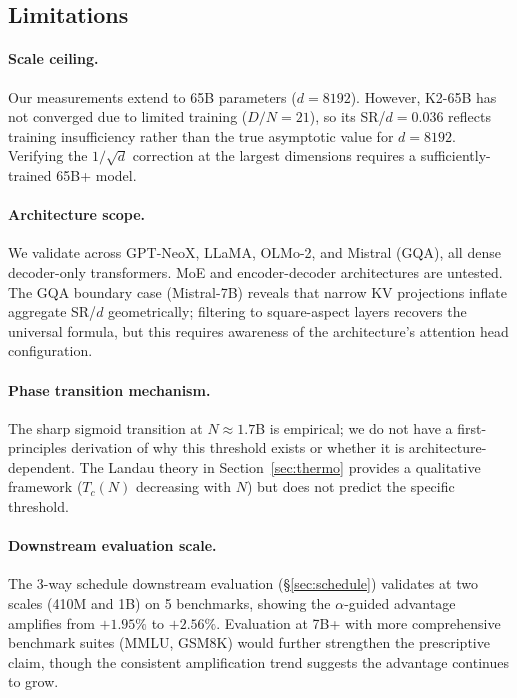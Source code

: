 \subsection{Limitations}

\paragraph{Scale ceiling.} Our measurements extend to 65B parameters ($d = 8192$). However, K2-65B has not converged due to limited training ($D/N = 21$), so its SR/$d = 0.036$ reflects training insufficiency rather than the true asymptotic value for $d = 8192$. Verifying the $1/\sqrt{d}$ correction at the largest dimensions requires a sufficiently-trained 65B+ model.

\paragraph{Architecture scope.} We validate across GPT-NeoX, LLaMA, OLMo-2, and Mistral (GQA), all dense decoder-only transformers. MoE and encoder-decoder architectures are untested. The GQA boundary case (Mistral-7B) reveals that narrow KV projections inflate aggregate SR/$d$ geometrically; filtering to square-aspect layers recovers the universal formula, but this requires awareness of the architecture's attention head configuration.

\paragraph{Phase transition mechanism.} The sharp sigmoid transition at $N \approx 1.7$B is empirical; we do not have a first-principles derivation of why this threshold exists or whether it is architecture-dependent. The Landau theory in Section~\ref{sec:thermo} provides a qualitative framework ($T_c(N)$ decreasing with $N$) but does not predict the specific threshold.

\paragraph{Downstream evaluation scale.} The 3-way schedule downstream evaluation (\S\ref{sec:schedule}) validates at two scales (410M and 1B) on 5 benchmarks, showing the $\alpha$-guided advantage amplifies from $+1.95\%$ to $+2.56\%$. Evaluation at 7B+ with more comprehensive benchmark suites (MMLU, GSM8K) would further strengthen the prescriptive claim, though the consistent amplification trend suggests the advantage continues to grow.

